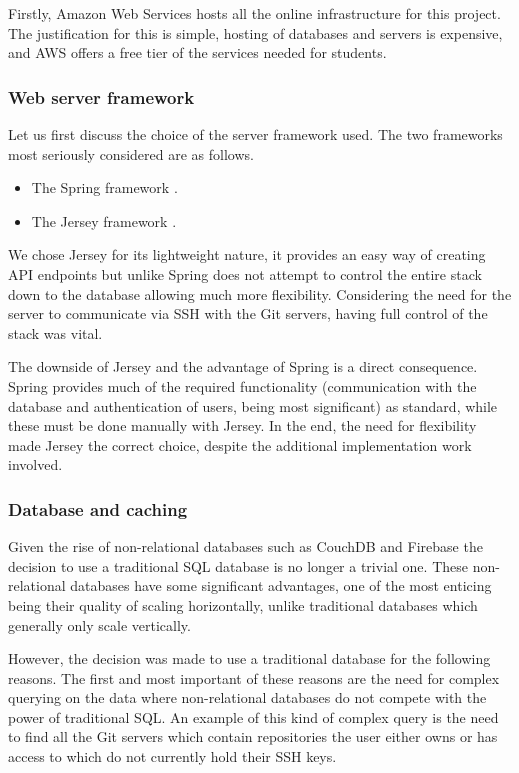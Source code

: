 Firstly, Amazon Web Services hosts all the online infrastructure for this project. The justification for this is simple, hosting of databases and servers is expensive, and AWS offers a free tier of the services needed for students.

\subsubsection{Web server framework}

Let us first discuss the choice of the server framework used. The two frameworks most seriously considered are as follows.

\begin{itemize}
\item The Spring framework \cite{spring}.
\item The Jersey framework \cite{jersey}.
\end{itemize}

We chose Jersey for its lightweight nature, it provides an easy way of creating API endpoints but unlike Spring does not attempt to control the entire stack down to the database allowing much more flexibility. Considering the need for the server to communicate via SSH with the Git servers, having full control of the stack was vital.

The downside of Jersey and the advantage of Spring is a direct consequence. Spring provides much of the required functionality (communication with the database and authentication of users, being most significant) as standard, while these must be done manually with Jersey. In the end, the need for flexibility made Jersey the correct choice, despite the additional implementation work involved.

\subsubsection{Database and caching}

Given the rise of non-relational databases such as CouchDB and Firebase the decision to use a traditional SQL database is no longer a trivial one. These non-relational databases have some significant advantages, one of the most enticing being their quality of scaling horizontally, unlike traditional databases which generally only scale vertically. 

However, the decision was made to use a traditional database for the following reasons. The first and most important of these reasons are the need for complex querying on the data where non-relational databases do not compete with the power of traditional SQL. An example of this kind of complex query is the need to find all the Git servers which contain repositories the user either owns or has access to which do not currently hold their SSH keys.

